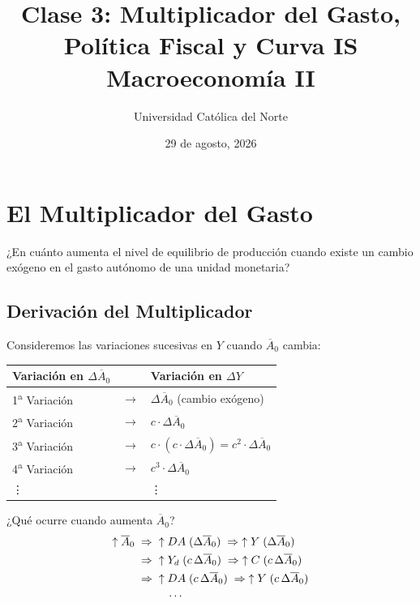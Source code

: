 \documentclass[11pt,a4paper]{article}
\title{\textbf{Clase 3: Multiplicador del Gasto, Política Fiscal y Curva IS} \\ \large Macroeconomía II}
\author{Universidad Católica del Norte}
\date{29 de agosto, 2026}
\newcommand{\barvar}[1]{\overline{#1}}
\begin{document}
\maketitle
\tableofcontents
\newpage

\section{El Multiplicador del Gasto}

\begin{definicionbox}
¿En cuánto aumenta el nivel de equilibrio de producción cuando existe un cambio exógeno en el gasto autónomo de una unidad monetaria?
\end{definicionbox}

\subsection{Derivación del Multiplicador}

Consideremos las variaciones sucesivas en $Y$ cuando $\barvar{A}_0$ cambia:

\begin{center}
\begin{tabular}{lll}
\textbf{Variación en $\Delta \barvar{A}_0$} & & \textbf{Variación en $\Delta Y$} \\
\hline
1\textsuperscript{a} Variación & $\rightarrow$ & $\Delta \barvar{A}_0$ \quad (cambio exógeno) \\
2\textsuperscript{a} Variación & $\rightarrow$ & $c \cdot \Delta \barvar{A}_0$ \\
3\textsuperscript{a} Variación & $\rightarrow$ & $c \cdot (c \cdot \Delta \barvar{A}_0) = c^2 \cdot \Delta \barvar{A}_0$ \\
4\textsuperscript{a} Variación & $\rightarrow$ & $c^3 \cdot \Delta \barvar{A}_0$ \\
\vdots & & \vdots \\
\end{tabular}
\end{center}

¿Qué ocurre cuando aumenta $\barvar{A}_0$?
\begin{align}
\uparrow \barvar{A}_0 \;\Rightarrow\; &\uparrow DA \;(\Delta \barvar{A}_0) \;\Rightarrow\; \uparrow Y \;(\Delta \barvar{A}_0) \notag \\
\Rightarrow\; &\uparrow Y_d \;(c\,\Delta \barvar{A}_0) \;\Rightarrow\; \uparrow C \;(c\,\Delta \barvar{A}_0) \notag \\
\Rightarrow\; &\uparrow DA \;(c\,\Delta \barvar{A}_0) \;\Rightarrow\; \uparrow Y \;(c\,\Delta \barvar{A}_0) \notag \\
&\quad \cdots \notag
\end{align}
\end{document}
